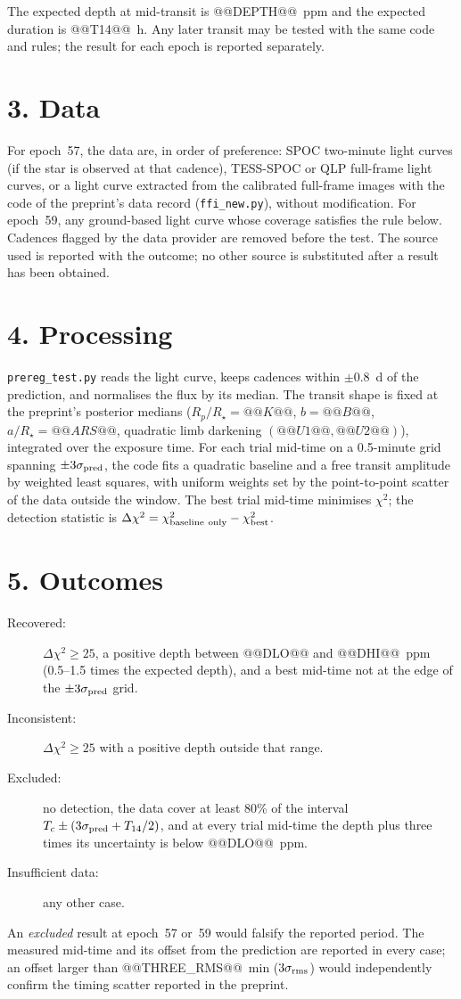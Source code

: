 \documentclass[11pt]{article}
\begin{document}
The expected depth at mid-transit is @@DEPTH@@~ppm and the expected duration is @@T14@@~h. Any later transit may be tested with the same code and rules; the result for each epoch is reported separately.

\section*{3. Data}
For epoch~57, the data are, in order of preference: SPOC two-minute light curves (if the star is observed at that cadence), TESS-SPOC or QLP full-frame light curves, or a light curve extracted from the calibrated full-frame images with the code of the preprint's data record (\texttt{ffi\_new.py}), without modification. For epoch~59, any ground-based light curve whose coverage satisfies the rule below. Cadences flagged by the data provider are removed before the test. The source used is reported with the outcome; no other source is substituted after a result has been obtained.

\section*{4. Processing}
\texttt{prereg\_test.py} reads the light curve, keeps cadences within $\pm 0.8$~d of the prediction, and normalises the flux by its median. The transit shape is fixed at the preprint's posterior medians ($R_p/R_\star = @@K@@$, $b = @@B@@$, $a/R_\star = @@ARS@@$, quadratic limb darkening $(@@U1@@, @@U2@@)$), integrated over the exposure time. For each trial mid-time on a 0.5-minute grid spanning $\pm 3\sigma_{\rm pred}$, the code fits a quadratic baseline and a free transit amplitude by weighted least squares, with uniform weights set by the point-to-point scatter of the data outside the window. The best trial mid-time minimises $\chi^2$; the detection statistic is $\Delta\chi^2 = \chi^2_{\rm baseline\ only} - \chi^2_{\rm best}$.

\section*{5. Outcomes}
\begin{description}
\item[Recovered:] $\Delta\chi^2 \geq 25$, a positive depth between @@DLO@@ and @@DHI@@~ppm (0.5--1.5 times the expected depth), and a best mid-time not at the edge of the $\pm 3\sigma_{\rm pred}$ grid.
\item[Inconsistent:] $\Delta\chi^2 \geq 25$ with a positive depth outside that range.
\item[Excluded:] no detection, the data cover at least 80\% of the interval $T_c \pm (3\sigma_{\rm pred} + T_{14}/2)$, and at every trial mid-time the depth plus three times its uncertainty is below @@DLO@@~ppm.
\item[Insufficient data:] any other case.
\end{description}
An \emph{excluded} result at epoch~57 or~59 would falsify the reported period. The measured mid-time and its offset from the prediction are reported in every case; an offset larger than @@THREE_RMS@@~min ($3\sigma_{\rm rms}$) would independently confirm the timing scatter reported in the preprint.
\end{document}
